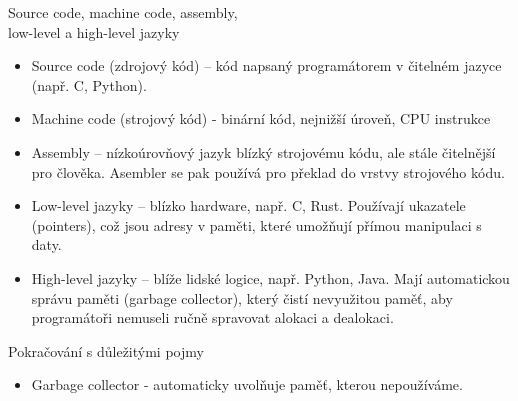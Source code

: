 \documentclass[aspectratio=169,xcolor=dvipsnames, t]{beamer}
\begin{document}
{\begin{frame}{Source code, machine code, assembly, \\ low-level a high-level jazyky}
    \begin{itemize}
        \item Source code (zdrojový kód) – kód napsaný programátorem v čitelném jazyce (např. C, Python).
        \item Machine code (strojový kód) - binární kód, nejnižší úroveň, CPU instrukce
\item Assembly – nízkoúrovňový jazyk blízký strojovému kódu, ale stále čitelnější pro člověka. Asembler se pak používá pro překlad do vrstvy strojového kódu.
\item Low-level jazyky – blízko hardware, např. C, Rust. Používají ukazatele (pointers), což jsou adresy v paměti, které umožňují přímou manipulaci s daty.
\item High-level jazyky – blíže lidské logice, např. Python, Java. Mají automatickou správu paměti (garbage collector), který čistí nevyužitou paměť, aby programátoři nemuseli ručně spravovat alokaci a dealokaci.
\end{itemize}
\end{frame}
\begin{frame}{Pokračování s důležitými pojmy}
    \begin{itemize}
        \item Garbage collector - automaticky uvolňuje paměť, kterou nepoužíváme.
    \end{itemize}
\end{frame}





}
\end{document}
